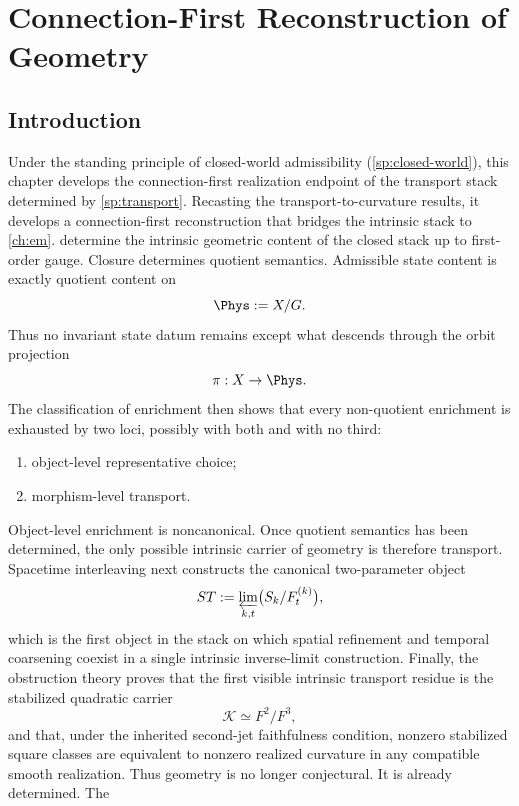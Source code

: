 \chapter{Connection-First Reconstruction of Geometry}
\label{ch:connection}
\section{Introduction}
Under the standing principle of closed-world admissibility
(\cref{sp:closed-world}), this chapter develops the connection-first
realization endpoint of the transport stack determined by
\cref{sp:transport}.
Recasting the transport-to-curvature results, it develops a
connection-first reconstruction that bridges the intrinsic stack to
\cref{ch:em}.
determine the intrinsic geometric content of the
closed stack up to first-order gauge.
Closure determines quotient semantics.  Admissible state content is exactly
quotient content on
\[
	\Phys:=X/G.
\]
Thus no invariant state datum remains except what descends through the
orbit projection
\[
	\pi:X\to\Phys.
\]
The classification of enrichment then shows that every
non-quotient enrichment is exhausted by two loci, possibly with both
and with no third:
\begin{enumerate}[label=\textup{(\alph*)}]
	\item
	      object-level representative choice;
	\item
	      morphism-level transport.
\end{enumerate}
Object-level enrichment is noncanonical. Once quotient semantics has
been determined, the only possible intrinsic carrier of geometry is
therefore transport.
Spacetime interleaving next constructs the canonical two-parameter
object
\[
	ST:=\varprojlim_{k,t}\bigl(S_k/F_t^{(k)}\bigr),
\]
which is the first object in the stack on which spatial refinement and
temporal coarsening coexist in a single intrinsic inverse-limit
construction.
Finally, the obstruction theory proves that the first visible intrinsic
transport residue is the stabilized quadratic carrier
\[
	\mathcal K\simeq F^2/F^3,
\]
and that, under the inherited second-jet faithfulness condition,
nonzero stabilized square classes are equivalent to nonzero realized
curvature in any compatible smooth realization.
Thus geometry is no longer conjectural.  It is already determined.  The
